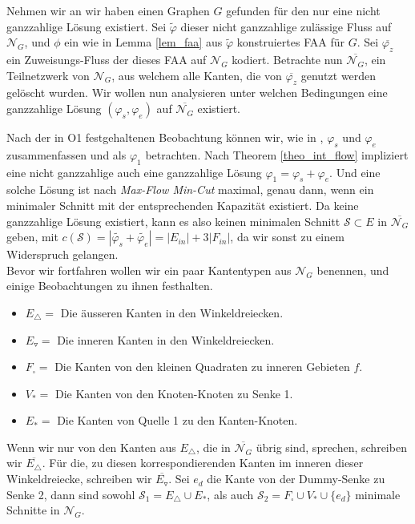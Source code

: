 Nehmen wir an wir haben einen Graphen $G$ gefunden für den nur eine nicht ganzzahlige Lösung existiert. Sei $\tilde{\varphi}$ dieser nicht ganzzahlige zulässige Fluss auf $\mathcal{N}_G$, und $\phi$ ein wie in Lemma \ref{lem_faa} aus $\tilde{\varphi}$ konstruiertes FAA für $G$. Sei $\overline{\varphi_z}$ ein Zuweisungs-Fluss der dieses FAA auf $\mathcal{N}_G$ kodiert. Betrachte nun $\overline{\mathcal{N}_G}$, ein Teilnetzwerk von $\mathcal{N}_G$, aus welchem alle Kanten, die von $\overline{\varphi_z}$ genutzt werden gelöscht wurden. Wir wollen nun analysieren unter welchen Bedingungen eine ganzzahlige Lösung $(\varphi_s,\varphi_e)$ auf $\overline{\mathcal{N}_G}$ existiert.

Nach der in O1 festgehaltenen Beobachtung können wir, wie in \cite{af15}, $\varphi_s$ und $\varphi_e$ zusammenfassen und als $\varphi_1$ betrachten. Nach Theorem \ref{theo_int_flow} impliziert eine nicht ganzzahlige auch eine ganzzahlige Lösung $\varphi_1=\varphi_s+\varphi_e$. Und eine solche Lösung ist nach \textit{Max-Flow Min-Cut} maximal, genau dann, wenn ein minimaler Schnitt mit der entsprechenden Kapazität existiert. Da keine ganzzahlige Lösung existiert, kann es also keinen minimalen Schnitt $\mathcal{S} \subset E$ in $\overline{\mathcal{N}_G}$ geben, mit $c(\mathcal{S}) = |\tilde{\varphi_s}+\tilde{\varphi_e}| = |E_{in}| + 3|F_{in}|$, da wir sonst zu einem Widerspruch gelangen.\\

Bevor wir fortfahren wollen wir ein paar Kantentypen aus $\mathcal{N}_G$ benennen, und einige Beobachtungen zu ihnen festhalten.

\begin{itemize}
\item $E_\triangle = $ Die äusseren Kanten in den Winkeldreiecken.
\item $E_\triangledown= $ Die inneren Kanten in den Winkeldreiecken.
\item $F_\square = $ Die Kanten von den kleinen Quadraten zu inneren Gebieten $f$.
\item $V_{*} = $ Die Kanten von den Knoten-Knoten zu Senke 1.
\item $E_{*} = $ Die Kanten von Quelle 1 zu den Kanten-Knoten.
\end{itemize}

Wenn wir nur von den Kanten aus $E_\triangle$, die in $\overline{\mathcal{N}_G}$ übrig sind, sprechen, schreiben wir $\overline{E_\triangle}$. Für die, zu diesen korrespondierenden Kanten im inneren dieser Winkeldreiecke, schreiben wir $\overline{E_\triangledown}$. Sei $e_{d}$ die Kante von der Dummy-Senke zu Senke 2, dann sind sowohl $\mathcal{S}_1 = E_\triangle \cup E_{*}$, als auch $\mathcal{S}_2 = F_\square \cup V_{*} \cup \{e_{d}\}$ minimale Schnitte in $\mathcal{N}_G$.

